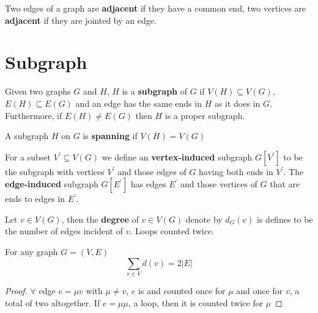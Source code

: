 			\begin{definition}[adjacent]
				Two edges of a graph are \textbf{adjacent} if they have a common end, two vertices are \textbf{adjacent} if they are jointed by an edge.
			\end{definition}

		\section{Subgraph}
			\begin{definition}[subgraph]
				Given two graphs $G$ and $H$, $H$ is a \textbf{subgraph} of $G$ if $V(H)\subseteq V(G)$, $E(H)\subseteq E(G)$ and an edge has the same ends in $H$ as it does in $G$. Furthermore, if $E(H)\neq E(G)$ then $H$ is a proper subgraph.
			\end{definition}
			
			\begin{definition}[spanning]
				A subgraph $H$ on $G$ is \textbf{spanning} if $V(H) = V(G)$
			\end{definition}

			\begin{definition}
				For a subset $V^{'}\subseteq V(G)$ we define an \textbf{vertex-induced} subgraph $G[V^{'}]$ to be the subgraph with vertices $V^{'}$ and those edges of $G$ having both ends in $V^{'}$. The \textbf{edge-induced} subgraph $G[E^{'}]$ has edges $E^{'}$ and those vertices of $G$ that are ends to edges in $E^{'}$.
			\end{definition}


			\begin{definition}[degree]
				Let $v\in V(G)$, then the \textbf{degree} of $v\in V(G)$ denote by $d_G(v)$ is defines to be the number of edges incident of $v$. Loops counted twice.
			\end{definition}			

			\begin{theorem}
				For any graph $G=(V, E)$
				\begin{equation}
					\sum_{v\in V}d(v) = 2|E|
				\end{equation}			
			\end{theorem}

			\begin{proof}
				$\forall$ edge $e=\mu v$ with $\mu \neq v$, $e$ is  and counted once for $\mu$ and once for $v$, a total of two altogether. If $e=\mu \mu$, a loop, then it is counted twice for $\mu$			
			\end{proof}

